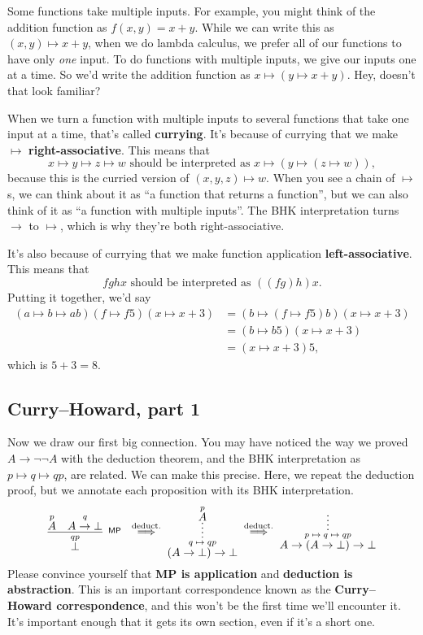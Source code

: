 \documentclass[11pt,paper=letter]{scrartcl}
\renewcommand{\sf}{\mathsf}
\renewcommand{\lnot}{\neg}
\newcommand{\vc}[1]{\vcenter{\hbox{#1}}}
\begin{document}
Some functions take multiple inputs. For example, you might think of the addition function as $f(x, y) = x + y$. While we can write this as $(x, y) \mapsto x + y$, when we do lambda calculus, we prefer all of our functions to have only \emph{one} input. To do functions with multiple inputs, we give our inputs one at a time. So we'd write the addition function as $x \mapsto (y \mapsto x + y)$. Hey, doesn't that look familiar?

When we turn a function with multiple inputs to several functions that take one input at a time, that's called \textbf{currying}. It's because of currying that we make $\mapsto$ \textbf{right-associative}. This means that \[
  x \mapsto y \mapsto z \mapsto w
  \text{ should be interpreted as }
  x \mapsto (y \mapsto (z \mapsto w)),
\]
because this is the curried version of $(x, y, z) \mapsto w$. When you see a chain of $\mapsto$s, we can think about it as ``a function that returns a function'', but we can also think of it as ``a function with multiple inputs''. The BHK interpretation turns $\to$ to $\mapsto$, which is why they're both right-associative.

It's also because of currying that we make function application \textbf{left-associative}. This means that \[
  fghx \text{ should be interpreted as } ((fg)h)x.
\]
Putting it together, we'd say
\begin{align*}
(a \mapsto b \mapsto ab)(f \mapsto f5)(x \mapsto x + 3)
&= (b \mapsto (f \mapsto f5)b)(x \mapsto x + 3) \\
&= (b \mapsto b5)(x \mapsto x + 3)\\
&= (x \mapsto x + 3)5,
\end{align*}
which is $5 + 3 = 8$.

\subsection{Curry--Howard, part 1}

Now we draw our first big connection. You may have noticed the way we proved $A \to \lnot\lnot A$ with the deduction theorem, and the BHK interpretation as $p \mapsto q \mapsto qp$, are related. We can make this precise. Here, we repeat the deduction proof, but we annotate each proposition with its BHK interpretation.
\begin{align*}
\vc{\infer[^\sf{MP}]
{
\overset{qp}{\false}
}
{\overset{p}{A} & \overset{q}{A \to \false}}
}
\;\overset{\text{deduct.}}{\implies}\;
\vc{\infer*
{\overset{q\;\mapsto\;qp}{(A \to \false) \to \false}}
{\overset{p}{A}}}
\;\overset{\text{deduct.}}{\implies}\;
\vc{\infer*
{\overset{p\;\mapsto\;q\;\mapsto\;qp}{A \to (A \to \false) \to \false}}
{}}
\end{align*}
Please convince yourself that \textbf{\textsf{MP} is application} and \textbf{deduction is abstraction}. This is an important correspondence known as the \textbf{Curry--Howard correspondence}, and this won't be the first time we'll encounter it. It's important enough that it gets its own section, even if it's a short one.
\end{document}

